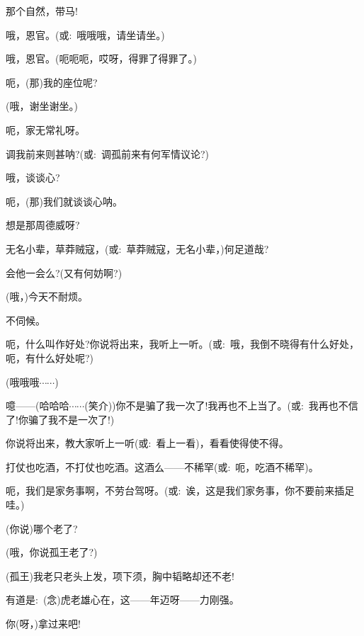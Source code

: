 {那个自然，带马!

\vspace{5pt}



哦，恩官。({\akai 或}:~哦哦哦，请坐请坐。)

哦，恩官。(呃呃呃，哎呀，得罪了得罪了。)

呃，(那)我的座位呢?

(哦，谢坐谢坐。)

呃，家无常礼呀。

调我前来则甚呐?({\akai 或}:~调孤前来有何军情议论?)

哦，谈谈心?

呃，(那)我们就谈谈心呐。

想是那周德威呀?

无名小辈，草莽贼寇，({\akai 或}:~草莽贼寇，无名小辈，)何足道哉?

会他一会么?(又有何妨啊?)

(哦，)今天不耐烦。

不伺候。\hspace{10pt}~

呃，什么叫作好处?你说将出来，我听上一听。({\akai 或}:~哦，我倒不晓得有什么好处，呃，有什么好处呢?)

(哦哦哦$\cdots{}\cdots{}$)

噫------(哈哈哈$\cdots{}\cdots{}$({\hwfs 笑}{\hwfs 介}))你不是骗了我一次了!我再也不上当了。({\akai 或}:~我再也不信了!你骗了我不是一次了!)

你说将出来，教大家听上一听({\akai 或}:~看上一看)，看看使得使不得。

打仗也吃酒，不打仗也吃酒。这酒么------不稀罕({\akai 或}:~呃，吃酒不稀罕)。

呃，我们是家务事啊，不劳台驾呀。({\akai 或}:~诶，这是我们家务事，你不要前来插足哇。)

(你说)哪个老了?

(哦，你说孤王老了?)

(孤王)我老只老头上发，项下须，胸中韬略却还不老!

有道是:~({\akai 念})虎老雄心在，这------年迈呀------力刚强。

你(呀，)拿过来吧!

}
